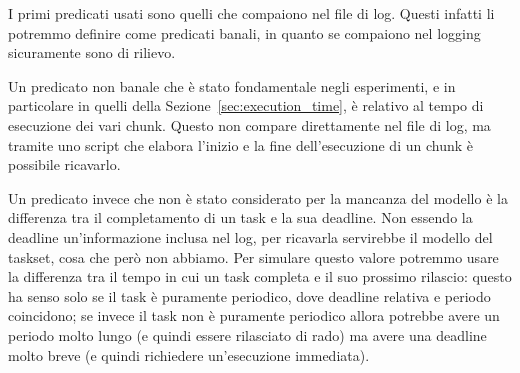 I primi predicati usati sono quelli che compaiono nel file di log. Questi infatti li potremmo definire come predicati banali, in quanto se compaiono nel logging sicuramente sono di rilievo.

Un predicato non banale che è stato fondamentale negli esperimenti, e in particolare in quelli della Sezione~\ref{sec:execution_time}, è relativo al tempo di esecuzione dei vari chunk. Questo non compare direttamente nel file di log, ma tramite uno script che elabora l'inizio e la fine dell'esecuzione di un chunk è possibile ricavarlo.

Un predicato invece che non è stato considerato per la mancanza del modello è la differenza tra il completamento di un task e la sua deadline. Non essendo la deadline un'informazione inclusa nel log, per ricavarla servirebbe il modello del taskset, cosa che però non abbiamo. Per simulare questo valore potremmo usare la differenza tra il tempo in cui un task completa e il suo prossimo rilascio: questo ha senso solo se il task è puramente periodico, dove deadline relativa e periodo coincidono; se invece il task non è puramente periodico allora potrebbe avere un periodo molto lungo (e quindi essere rilasciato di rado) ma avere una deadline molto breve (e quindi richiedere un'esecuzione immediata).